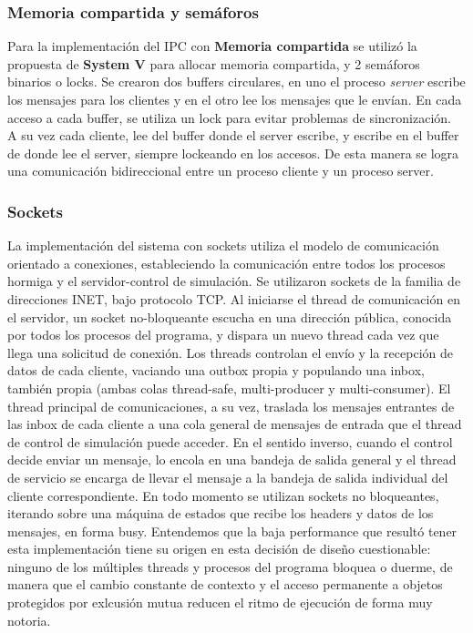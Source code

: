 \documentclass[a4paper,10pt]{article}
\begin{document}
\subsubsection{Memoria compartida y semáforos}
Para la implementación del IPC con \textbf{Memoria compartida} se utilizó la propuesta de \textbf{System V} para allocar memoria compartida, y 
2 semáforos binarios o locks.
Se crearon dos buffers circulares, en uno el proceso \textit{server} escribe los mensajes para los clientes y en el otro lee los mensajes que
le envían. En cada acceso a cada buffer, se utiliza un lock para evitar problemas de sincronización.\\
A su vez cada cliente, lee del buffer donde el server escribe, y escribe en el buffer de donde lee el server, siempre lockeando en los accesos.
De esta manera se logra una comunicación bidireccional entre un proceso cliente y un proceso server.

\subsubsection{Sockets}

La implementación del sistema con sockets utiliza el modelo de comunicación orientado a conexiones, estableciendo la comunicación entre todos los procesos hormiga y el servidor-control de simulación. Se utilizaron sockets de la familia de direcciones INET, bajo protocolo TCP.
Al iniciarse el thread de comunicación en el servidor, un socket no-bloqueante escucha en una dirección pública, conocida por todos los procesos del programa, y dispara un nuevo thread cada vez que llega una solicitud de conexión.
Los threads controlan el envío y la recepción de datos de cada cliente, vaciando una outbox propia y populando una inbox, también propia (ambas colas thread-safe, multi-producer y multi-consumer). El thread principal de comunicaciones, a su vez, traslada los mensajes entrantes de las inbox de cada cliente a una cola general de mensajes de entrada que el thread de control de simulación puede acceder. En el sentido inverso, cuando el control decide enviar un mensaje, lo encola en una bandeja de salida general y el thread de servicio se encarga de llevar el mensaje a la bandeja de salida individual del cliente correspondiente.
En todo momento se utilizan sockets no bloqueantes, iterando sobre una máquina de estados que recibe los headers y datos de los mensajes, en forma busy. Entendemos que la baja performance que resultó tener esta implementación tiene su origen en esta decisión de diseño cuestionable: ninguno de los múltiples threads y procesos del programa bloquea o duerme, de manera que el cambio constante de contexto y el acceso permanente a objetos protegidos por exlcusión mutua reducen el ritmo de ejecución de forma muy notoria.
\end{document}
